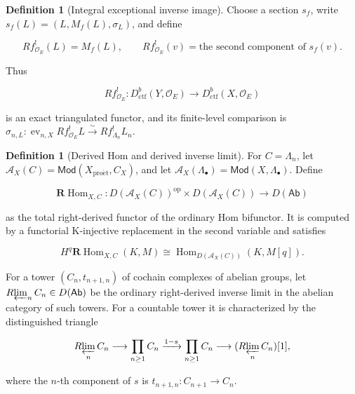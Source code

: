 \documentclass[10pt]{article}
\theoremstyle{definition}
\newtheorem{definition}[theorem]{Definition}
\newcommand{\OO}{\mathcal O}
\newcommand{\Dctf}{D^b_{\mathrm{ctf}}}
\begin{document}
\begin{definition}[Integral exceptional inverse image]
Choose a section \(s_f\), write
\(s_f(L)=(L,M_f(L),\sigma_L)\), and define

\[
 Rf^!_{\OO_E}(L)=M_f(L),\qquad
 Rf^!_{\OO_E}(v)=\text{the second component of }s_f(v).
\]

Thus

\[
 Rf^!_{\OO_E}:\Dctf(Y,\OO_E)\longrightarrow\Dctf(X,\OO_E)
\]

is an exact triangulated functor, and its finite-level comparison is
\(\sigma_{n,L}:\operatorname{ev}_{n,X}Rf^!_{\OO_E}L
\xrightarrow{\sim}Rf^!_{\Lambda_n}L_n\).
\end{definition}

\begin{definition}[Derived Hom and derived inverse limit]
For \(C=\Lambda_n\), let
\(\mathcal A_X(C)=\mathsf{Mod}(X_{\mathrm{pro\acute et}},C_X)\), and let
\(\mathcal A_X(\Lambda_\bullet)=\mathsf{Mod}(X,\Lambda_\bullet)\).
Define

\[
 \mathbf R\!\operatorname{Hom}_{X,C}:
 D(\mathcal A_X(C))^{\mathrm{op}}\times D(\mathcal A_X(C))
 \longrightarrow D(\mathsf{Ab})
\]

as the total right-derived functor of the ordinary Hom bifunctor.  It is
computed by a functorial K-injective replacement in the second variable and
satisfies

\[
 H^q\mathbf R\!\operatorname{Hom}_{X,C}(K,M)
 \cong\operatorname{Hom}_{D(\mathcal A_X(C))}(K,M[q]).
\]

For a tower \((C_n,t_{n+1,n})\) of cochain complexes of abelian groups,
let \(R\!\varprojlim_n C_n\in D(\mathsf{Ab})\) be the ordinary right-derived
inverse limit in the abelian category of such towers.  For a countable tower
it is characterized by the distinguished triangle

\[
 R\!\varprojlim_n C_n\longrightarrow
 \prod_{n\geq1}C_n\xrightarrow{1-s}\prod_{n\geq1}C_n
 \longrightarrow (R\!\varprojlim_n C_n)[1],
\]

where the \(n\)-th component of \(s\) is
\(t_{n+1,n}:C_{n+1}\to C_n\).
\end{definition}
\end{document}
